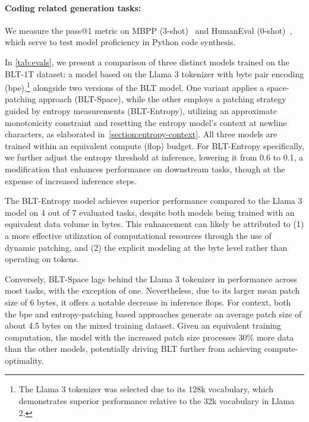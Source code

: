 \paragraph{Coding related generation tasks:}  We measure the pass@1 metric on MBPP (3-shot)~\citep{Eval_MBPP} and HumanEval (0-shot)~\citep{Eval_HumanEval}, which serve to test model proficiency in Python code synthesis.

In \autoref{tab:evals}, we present a comparison of three distinct models trained on the {\textsc BLT}-1T dataset: a model based on the Llama 3 tokenizer with byte pair encoding (bpe),\footnote{The Llama 3 tokenizer was selected due to its 128k vocabulary, which demonstrates superior performance relative to the 32k vocabulary in Llama 2.} alongside two versions of the {\textsc BLT} model. One variant applies a space-patching approach ({\textsc BLT}-Space), while the other employs a patching strategy guided by entropy measurements ({\textsc BLT}-Entropy), utilizing an approximate monotonicity constraint and resetting the entropy model’s context at newline characters, as elaborated in~\autoref{section:entropy-context}. All three models are trained within an equivalent compute (flop) budget. For {\textsc BLT}-Entropy specifically, we further adjust the entropy threshold at inference, lowering it from 0.6 to 0.1, a modification that enhances performance on downstream tasks, though at the expense of increased inference steps.

The {\textsc BLT}-Entropy model achieves superior performance compared to the Llama 3 model on 4 out of 7 evaluated tasks, despite both models being trained with an equivalent data volume in bytes. This enhancement can likely be attributed to (1) a more effective utilization of computational resources through the use of dynamic patching, and (2) the explicit modeling at the byte level rather than operating on tokens.

Conversely, {\textsc BLT}-Space lags behind the Llama 3 tokenizer in performance across most tasks, with the exception of one. Nevertheless, due to its larger mean patch size of 6 bytes, it offers a notable decrease in inference flops. For context, both the bpe and entropy-patching based approaches generate an average patch size of about 4.5 bytes on the mixed training dataset. Given an equivalent training computation, the model with the increased patch size processes 30\% more data than the other models, potentially driving {\textsc BLT} further from achieving compute-optimality.

